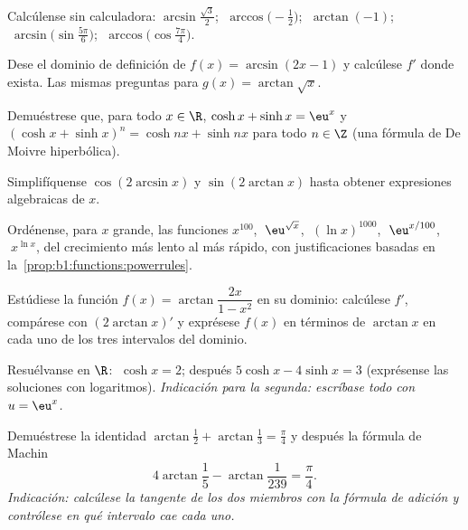 \begin{exercise}[$\star$]\label{exo:b1:functions:1}
Calcúlense sin calculadora: $\arcsin\frac{\sqrt 3}{2}$;
$\;\arccos\bigl(-\frac 12\bigr)$; $\;\arctan(-1)$;
$\;\arcsin\bigl(\sin\frac{5\pi}{6}\bigr)$;
$\;\arccos\bigl(\cos\frac{7\pi}{4}\bigr)$.
\end{exercise}

\begin{exercise}[$\star$]\label{exo:b1:functions:2}
Dese el dominio de definición de $f(x) = \arcsin(2x - 1)$ y calcúlese
$f'$ donde exista. Las mismas preguntas para $g(x) = \arctan\sqrt{x}$.
\end{exercise}

\begin{exercise}[$\star$]\label{exo:b1:functions:3}
Demuéstrese que, para todo $x \in \R$, $\cosh x + \sinh x = \eu^x$ y
$(\cosh x + \sinh x)^n = \cosh nx + \sinh nx$ para todo $n \in \Z$
(una fórmula de De Moivre hiperbólica).
\end{exercise}

\begin{exercise}[$\star$]\label{exo:b1:functions:4}
Simplifíquense $\cos(2\arcsin x)$ y $\sin(2\arctan x)$ hasta obtener
expresiones algebraicas de $x$.
\end{exercise}

\begin{exercise}[$\star$]\label{exo:b1:functions:5}
Ordénense, para $x$ grande, las funciones
$x^{100}$, $\;\eu^{\sqrt x}$, $\;(\ln x)^{1000}$, $\;\eu^{x/100}$,
$\;x^{\ln x}$, del crecimiento más lento al más rápido, con
justificaciones basadas en la~\cref{prop:b1:functions:powerrules}.
\end{exercise}

\begin{exercise}[$\star\star$]\label{exo:b1:functions:6}
Estúdiese la función $f(x) = \arctan\dfrac{2x}{1 - x^2}$ en su dominio:
calcúlese $f'$, compárese con $(2\arctan x)'$ y exprésese $f(x)$ en
términos de $\arctan x$ en cada uno de los tres intervalos del dominio.
\end{exercise}

\begin{exercise}[$\star\star$]\label{exo:b1:functions:7}
Resuélvanse en $\R$: $\;\cosh x = 2$; después $5\cosh x - 4 \sinh x = 3$
(exprésense las soluciones con logaritmos). \emph{Indicación para la
segunda: escríbase todo con $u = \eu^x$.}
\end{exercise}

\begin{exercise}[$\star\star$]\label{exo:b1:functions:8}
Demuéstrese la identidad $\arctan\frac{1}{2} + \arctan\frac{1}{3} =
\frac{\pi}{4}$ y después la fórmula de Machin
\[
4\arctan\frac 15 - \arctan\frac{1}{239} = \frac{\pi}{4}.
\]
\emph{Indicación: calcúlese la tangente de los dos miembros con la
fórmula de adición y contrólese en qué intervalo cae cada uno.}
\end{exercise}

